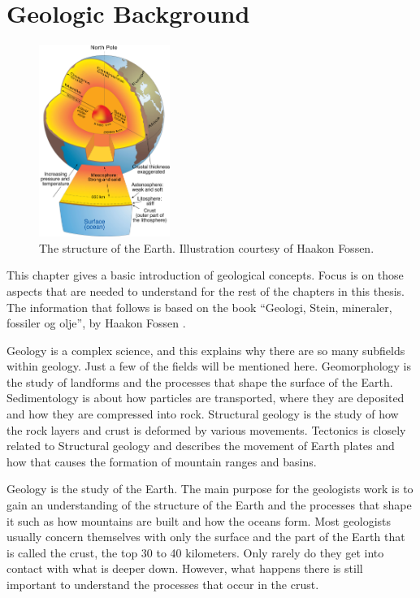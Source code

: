 \documentclass[a4paper,12pt]{report}
\begin{document}
\chapter{Geologic Background}
\label{sec:geology}
\begin{figure}
  \begin{center}
    \includegraphics[width=0.38\textwidth]{thesis/geo/english/indre.jpg}
  \end{center}
  \caption{The structure of the Earth. Illustration courtesy of Haakon Fossen.}
  \label{fig:core}
\end{figure}
This chapter gives a basic introduction of geological concepts. Focus is on those aspects that are needed to understand for the rest of the chapters in this thesis. The information that follows is based on the book ``Geologi, Stein, mineraler, fossiler og olje'', by Haakon Fossen \cite{fossen2008geologi}.

Geology is a complex science, and this explains why there are so many subfields within geology. Just a few of the fields will be mentioned here. Geomorphology is the study of landforms and the processes that shape the surface of the Earth. Sedimentology is about how particles are transported, where they are deposited and how they are compressed into rock. Structural geology is the study of how the rock layers and crust is deformed by various movements. Tectonics is closely related to Structural geology and describes the movement of Earth plates and how that causes the formation of mountain ranges and basins.

Geology is the study of the Earth. The main purpose for the geologists work is to gain an understanding of the structure of the Earth and the processes that shape it such as how mountains are built and how the oceans form. Most geologists usually concern themselves with only the surface and the part of the Earth that is called the crust, the top 30 to 40 kilometers. Only rarely do they get into contact with what is deeper down. However, what happens there is still important to understand the processes that occur in the crust. 
\end{document}
